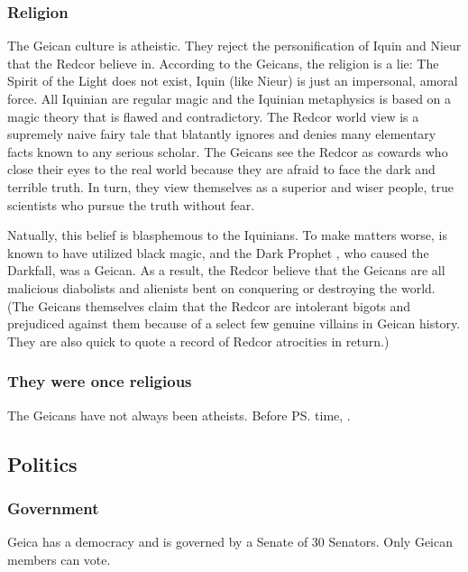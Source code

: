 \subsubsection{Religion}
The Geican culture is atheistic. They reject the personification of Iquin and Nieur that the Redcor believe in. According to the Geicans, the  religion is a lie: The Spirit of the Light does not exist, Iquin (like Nieur) is just an impersonal, amoral force. All Iquinian  are regular magic and the Iquinian metaphysics is based on a magic theory that is flawed and contradictory. The Redcor world view is a supremely naive fairy tale that blatantly ignores and denies many elementary facts known to any serious scholar. The Geicans see the Redcor as cowards who close their eyes to the real world because they are afraid to face the dark and terrible truth. In turn, they view themselves as a superior and wiser people, true scientists who pursue the truth without fear. 

Natually, this belief is blasphemous to the Iquinians. To make matters worse, \ClanGeican is known to have utilized black magic, and the Dark Prophet \Belzir{}, who caused the Darkfall, was a Geican. As a result, the Redcor believe that the Geicans are all malicious diabolists and alienists bent on conquering or destroying the world. (The Geicans themselves claim that the Redcor are intolerant bigots and prejudiced against them because of a select few genuine villains in Geican history. They are also quick to quote a record of Redcor atrocities in return.) 





\subsubsection{They were once religious}
The Geicans have not always been atheists. 
Before \ps{\Belzir}{} time, . 










\subsection{Politics}
\subsubsection{Government}
Geica has a democracy and is governed by a Senate of 30 Senators. Only Geican \vclan members can vote. 

